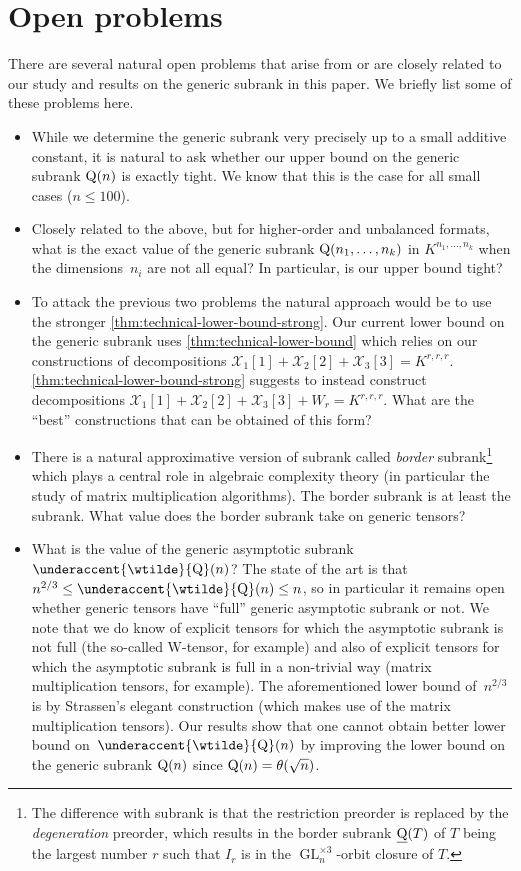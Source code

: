\documentclass[10pt,a4paper]{article}
\theoremstyle{definition}
\theoremstyle{remark}
\newcommand{\bsubrank}{{\underline{\rm Q}}}
\newcommand{\gensubrank}{{\rm Q}}
\newcommand{\GL}{\operatorname{GL}}
\DeclareMathOperator{\asympsubrank}{\underaccent{\wtilde}{Q}}
\begin{document}
\section{Open problems}\label{sec:open-problems}

There are several natural open problems that arise from or are closely related to our study and results on the generic subrank in this paper. We briefly list some of these problems here.

\begin{itemize}
    \item While we determine the generic subrank very precisely up to a small additive constant, it is natural to ask whether our upper bound on the generic subrank $\gensubrank(n)$ is exactly tight. We know that this is the case for all small cases ($n \leq 100$). 
    \item Closely related to the above, but for higher-order and unbalanced formats, what is the exact value of the generic subrank $\gensubrank(n_1,\ldots,n_k)$ in $K^{n_1,\ldots, n_k}$ when the dimensions~$n_i$ are not all equal? In particular, is our upper bound tight?
    \item To attack the previous two problems the natural approach would be to use the stronger 
    \autoref{thm:technical-lower-bound-strong}.
    Our current lower bound on the generic subrank uses \autoref{thm:technical-lower-bound} which relies on our constructions of decompositions $\mathcal{X}_1[1] + \mathcal{X}_2[2] + \mathcal{X}_3[3] = K^{r,r,r}$.  \autoref{thm:technical-lower-bound-strong} suggests to instead construct decompositions $\mathcal{X}_1[1] + \mathcal{X}_2[2] + \mathcal{X}_3[3] + W_r = K^{r,r,r}$. What are the ``best'' constructions that can be obtained of this form?
    \item There is a natural approximative version of subrank called \emph{border} subrank\footnote{The difference with subrank is that the restriction preorder is replaced by the \emph{degeneration} preorder, which results in the border subrank $\bsubrank(T)$ of $T$ being the largest number $r$ such that $I_r$ is in the $\GL_n^{\times3}$-orbit closure of $T$.} which plays a central role in algebraic complexity theory (in particular the study of matrix multiplication algorithms).
    The border subrank is at least the subrank. What value 
    does the border subrank take on generic tensors?
    \item What is the value of the generic asymptotic subrank $\asympsubrank(n)$? The state of the art is that $n^{2/3} \leq \asympsubrank(n) \leq n$, so in particular it remains open whether generic tensors have ``full'' generic asymptotic subrank or not. We note that we do know of explicit tensors for which the asymptotic subrank is not full (the so-called W-tensor, for example) and also of explicit tensors for which the asymptotic subrank is full in a non-trivial way (matrix multiplication tensors, for example). The aforementioned lower bound of~$n^{2/3}$ is by Strassen's elegant construction (which makes use of the matrix multiplication tensors). Our results show that one cannot obtain better lower bound on~$\asympsubrank(n)$ by improving the lower bound on the generic subrank $\gensubrank(n)$ since $\gensubrank(n) = \theta(\sqrt{n})$.

\end{itemize}
\end{document}
